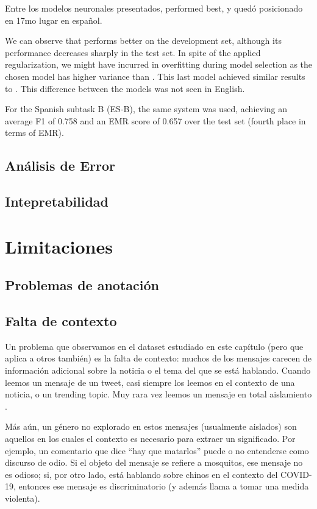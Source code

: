 Entre los modelos neuronales presentados, \elmobowmodel{} performed best, y quedó posicionado en 17mo lugar en español.


We can observe that \elmobowmodel{} performs better on the development set, although its performance decreases sharply in the test set. In spite of the applied regularization, we might have incurred in overfitting during model selection \cite{cawley2010over} as the chosen model has higher variance than \elmomodel{}. This last model achieved similar results to \svmmodel{}. This difference between the models was not seen in English.

For the Spanish subtask B (ES-B), the same \svmmodel{} system was used, achieving an average F1 of 0.758 and an EMR score of 0.657 over the test set (fourth place in terms of EMR).

\subsection{Análisis de Error}

\subsection{Intepretabilidad}

\section{Limitaciones}

\subsection{Problemas de anotación}

\subsection{Falta de contexto}

Un problema que observamos en el dataset estudiado en este capítulo (pero que aplica a otros también) es la falta de contexto: muchos de los mensajes carecen de información adicional sobre la noticia o el tema del que se está hablando. Cuando leemos un mensaje de un tweet, casi siempre los leemos en el contexto de una noticia, o un trending topic. Muy rara vez leemos un mensaje en total aislamiento .

Más aún, un género no explorado en estos mensajes (usualmente aislados) son aquellos en los cuales el contexto es necesario para extraer un significado. Por ejemplo, un comentario que dice ``hay que matarlos'' puede o no entenderse como discurso de odio. Si el objeto del mensaje se refiere a mosquitos, ese mensaje no es odioso; si, por otro lado, está hablando sobre chinos en el contexto del COVID-19, entonces ese mensaje es discriminatorio (y además llama a tomar una medida violenta).

